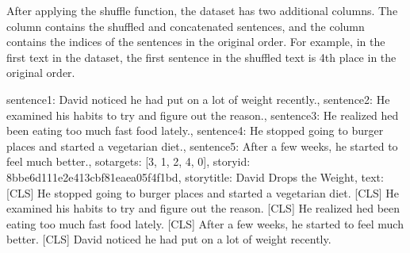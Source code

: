\documentclass[letterpaper,10pt,english]{jupyterBook}
\begin{document}
\sphinxAtStartPar
After applying the shuffle function, the dataset has two additional columns. The  column contains the shuffled and concatenated sentences, and the  column contains the indices of the sentences in the original order. For example, in the first text in the dataset, the first sentence in the shuffled text is 4th place in the original order.
\begin{sphinxVerbatimInput}

\begin{sphinxVerbatim}[commandchars=\\\{\}]
\PYG{p}{[}\PYG{p}{]}
\end{sphinxVerbatim}
\end{sphinxVerbatimInput}
\begin{sphinxVerbatimOutput}

\begin{sphinxVerbatim}[commandchars=\\\{\}]
\PYGZob{}\PYGZsq{}sentence1\PYGZsq{}: \PYGZsq{}David noticed he had put on a lot of weight recently.\PYGZsq{},
 \PYGZsq{}sentence2\PYGZsq{}: \PYGZsq{}He examined his habits to try and figure out the reason.\PYGZsq{},
 \PYGZsq{}sentence3\PYGZsq{}: \PYGZdq{}He realized he\PYGZsq{}d been eating too much fast food lately.\PYGZdq{},
 \PYGZsq{}sentence4\PYGZsq{}: \PYGZsq{}He stopped going to burger places and started a vegetarian \PYGZsq{}
              \PYGZsq{}diet.\PYGZsq{},
 \PYGZsq{}sentence5\PYGZsq{}: \PYGZsq{}After a few weeks, he started to feel much better.\PYGZsq{},
 \PYGZsq{}so\PYGZus{}targets\PYGZsq{}: [3, 1, 2, 4, 0],
 \PYGZsq{}storyid\PYGZsq{}: \PYGZsq{}8bbe6d11\PYGZhy{}1e2e\PYGZhy{}413c\PYGZhy{}bf81\PYGZhy{}eaea05f4f1bd\PYGZsq{},
 \PYGZsq{}storytitle\PYGZsq{}: \PYGZsq{}David Drops the Weight\PYGZsq{},
 \PYGZsq{}text\PYGZsq{}: \PYGZsq{}[CLS] He stopped going to burger places and started a vegetarian \PYGZsq{}
         \PYGZsq{}diet. [CLS] He examined his habits to try and figure out the reason. \PYGZsq{}
         \PYGZdq{}[CLS] He realized he\PYGZsq{}d been eating too much fast food lately. [CLS] \PYGZdq{}
         \PYGZsq{}After a few weeks, he started to feel much better. [CLS] David \PYGZsq{}
         \PYGZsq{}noticed he had put on a lot of weight recently.\PYGZsq{}\PYGZcb{}
\end{sphinxVerbatim}
\end{sphinxVerbatimOutput}
\end{document}
